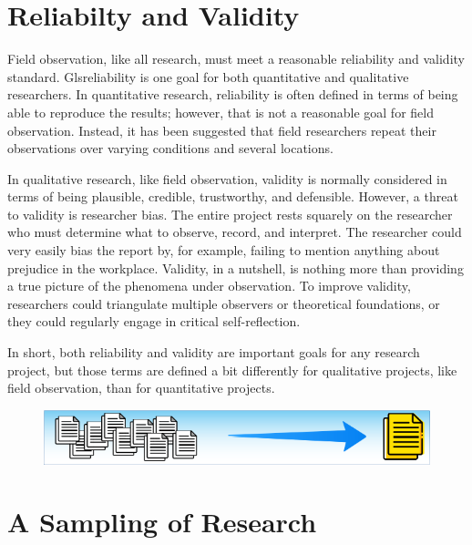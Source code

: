 \section{Reliabilty and Validity}

Field observation, like all research, must meet a reasonable reliability and validity standard. Gls{reliability} is one goal for both quantitative and qualitative researchers. In quantitative research, reliability is often defined in terms of being able to reproduce the results; however, that is not a reasonable goal for field observation. Instead, it has been suggested that field researchers repeat their observations over varying conditions and several locations.

In qualitative research, like field observation, \gls{validity} is normally considered in terms of being plausible, credible, trustworthy, and defensible. However, a threat to validity is researcher bias. The entire project rests squarely on the researcher who must determine what to observe, record, and interpret. The researcher could very easily bias the report by, for example, failing to mention anything about prejudice in the workplace. Validity, in a nutshell, is nothing more than providing a true picture of the phenomena under observation. To improve validity, researchers could triangulate multiple observers or theoretical foundations, or they could regularly engage in critical self-reflection. 

In short, both reliability and validity are important goals for any research project, but those terms are defined a bit differently for qualitative projects, like field observation, than for quantitative projects.

\noindent\begin{minipage}{\textwidth}
	\begin{figure}[H]
		\centering
		\includegraphics[width=.85\linewidth]{gfx/Sampling_Of_Research}
		\caption*{}
		\label{11:sampling_of_research}
	\end{figure}
	\vspace{-10.0ex} %
	\section{A Sampling of Research}
\end{minipage}
